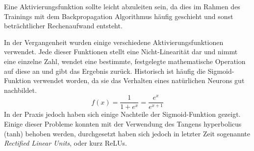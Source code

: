 Eine Aktivierungsfunktion sollte leicht abzuleiten sein, 
da dies im Rahmen des Trainings mit dem Backpropagation Algorithmus häufig geschieht 
und sonst beträchtlicher Rechenaufwand entsteht.

In der Vergangenheit wurden einige verschiedene Aktivierungsfunktionen verwendet.
Jede dieser Funktionen stellt eine Nicht-Linearität dar und nimmt eine einzelne Zahl, wendet eine bestimmte, festgelegte mathematische 
Operation auf diese an und gibt das Ergebnis zurück.
Historisch ist häufig die Sigmoid-Funktion verwendet worden, da sie das Verhalten eines natürlichen Neurons gut nachbildet.
\begin{equation}
	f(x) = \frac{1}{1 + e^x} = \frac{e^x}{e^{x + 1}}
	\label{func:Sigmoid}
\end{equation}
In der Praxis jedoch haben sich einige Nachteile der Sigmoid-Funktion gezeigt.
Einige dieser Probleme konnten mit der Verwendung des Tangens hyperbolicus (tanh) behoben werden, 
durchgesetzt haben sich jedoch in letzter Zeit sogenannte \textit{Rectified Linear Units}, oder kurz ReLUs.

	
	
